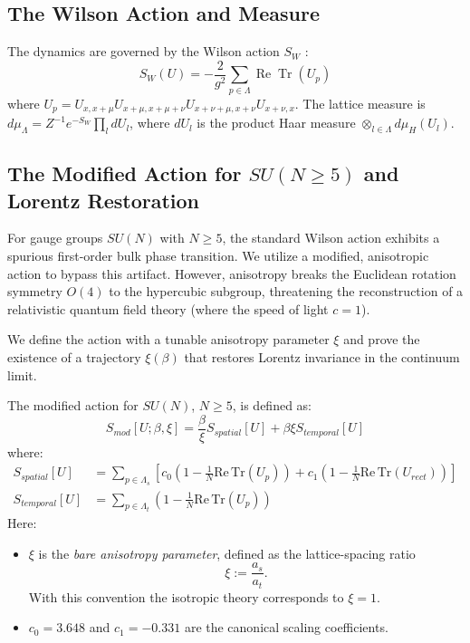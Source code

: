 \subsection{The Wilson Action and Measure}

The dynamics are governed by the Wilson action \(S_W\) \cite{wilson1974confinement}:
\begin{equation}
S_W(U) = -\frac{2}{g^2} \sum_{p \in \Lambda} \operatorname{Re} \operatorname{Tr}(U_p)
\end{equation}
where \(U_p = U_{x,x+\mu} U_{x+\mu, x+\mu+\nu} U_{x+\nu+\mu, x+\nu} U_{x+\nu, x}\). The lattice measure is \(d\mu_\Lambda = Z^{-1} e^{-S_W} \prod_{l} dU_l\), where \(dU_l\) is the product Haar measure \(\otimes_{l \in \Lambda} d\mu_H(U_l)\).

\subsection{The Modified Action for $SU(N \geq 5)$ and Lorentz Restoration}
\label{sec:modified_action_def}

For gauge groups $SU(N)$ with $N \geq 5$, the standard Wilson action exhibits a spurious first-order bulk phase transition. We utilize a modified, anisotropic action to bypass this artifact. However, anisotropy breaks the Euclidean rotation symmetry $O(4)$ to the hypercubic subgroup, threatening the reconstruction of a relativistic quantum field theory (where the speed of light $c=1$).

We define the action with a tunable anisotropy parameter $\xi$ and prove the existence of a trajectory $\xi(\beta)$ that restores Lorentz invariance in the continuum limit.

\begin{definition}\label{def:modified_action}
The modified action for $SU(N)$, $N \geq 5$, is defined as:
\begin{equation}
S_{mod}[U; \beta, \xi] = \frac{\beta}{\xi} S_{spatial}[U] + \beta \xi S_{temporal}[U]
\end{equation}
where:
\begin{align}
S_{spatial}[U] &= \sum_{p \in \Lambda_s} \left[ c_0 \left(1 - \frac{1}{N}\mathrm{Re}\,\mathrm{Tr}(U_p)\right) + c_1 \left(1 - \frac{1}{N}\mathrm{Re}\,\mathrm{Tr}(U_{rect})\right) \right] \\
S_{temporal}[U] &= \sum_{p \in \Lambda_t} \left(1 - \frac{1}{N}\mathrm{Re}\,\mathrm{Tr}(U_p)\right)
\end{align}
Here:
\begin{itemize}
    \item $\xi$ is the \emph{bare anisotropy parameter}, defined as the lattice-spacing ratio
    \[ \xi := \frac{a_s}{a_t}. \]
    With this convention the isotropic theory corresponds to $\xi=1$.
    \item $c_0 = 3.648$ and $c_1 = -0.331$ are the canonical scaling coefficients.
\end{itemize}
\end{definition}

